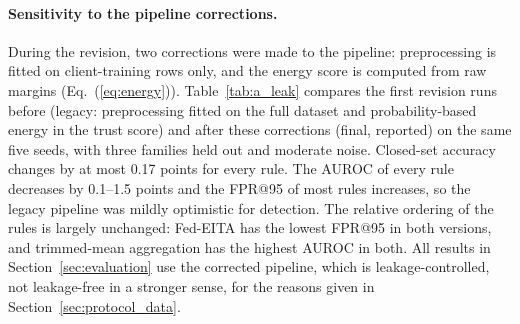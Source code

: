 \documentclass[pdflatex,sn-mathphys-num]{sn-jnl}
\begin{document}
{{{{{\paragraph{Sensitivity to the pipeline corrections.} During the revision, two corrections were made to the pipeline: preprocessing is fitted on client-training rows only, and the energy score is computed from raw margins (Eq.~(\ref{eq:energy})). Table~\ref{tab:a_leak} compares the first revision runs before (legacy: preprocessing fitted on the full dataset and probability-based energy in the trust score) and after these corrections (final, reported) on the same five seeds, with three families held out and moderate noise. Closed-set accuracy changes by at most 0.17 points for every rule. The AUROC of every rule decreases by 0.1--1.5 points and the FPR@95 of most rules increases, so the legacy pipeline was mildly optimistic for detection. The relative ordering of the rules is largely unchanged: Fed-EITA has the lowest FPR@95 in both versions, and trimmed-mean aggregation has the highest AUROC in both. All results in Section~\ref{sec:evaluation} use the corrected pipeline, which is leakage-controlled, not leakage-free in a stronger sense, for the reasons given in Section~\ref{sec:protocol_data}.

\begin{table}[!htbp]\centering
\caption{Sensitivity to the two pipeline corrections (mean over the five seeds of the first revision runs).}\label{tab:a_leak}
\scriptsize
\setlength{\tabcolsep}{4pt}
\end{table}

}}}}}
\end{document}
